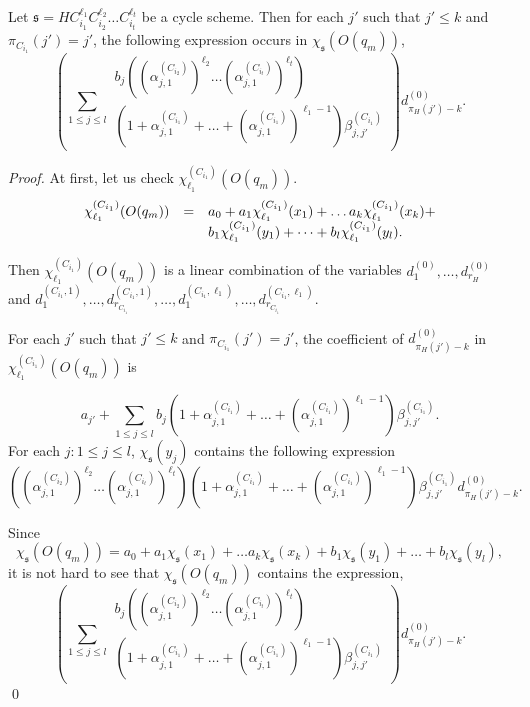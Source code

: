 \documentclass[runningheads,a4paper]{llncs}
\def\schm{{\mathfrak{s} }}
\begin{document}
\begin{proposition}\label{prop-cycle-schm}
Let $\schm=HC_{i_1}^{\ell_1} C_{i_2}^{\ell_2} \dots C_{i_t}^{\ell_t}$ be a cycle scheme. Then for each $j'$ such that $j' \le k$ and $\pi_{C_{i_1}}(j')=j'$, the following expression occurs in $\chi_{\schm}(O(q_m))$,
\[
\left(\sum \limits_{1 \le j \le l} 
\begin{array}{l}
b_j \left((\alpha^{(C_{i_2})}_{j,1})^{\ell_2} \dots (\alpha^{(C_{i_t})}_{j,1})^{\ell_t}\right) \\
\left(1+\alpha^{(C_{i_1})}_{j,1} + \dots + (\alpha^{(C_{i_1})}_{j,1})^{\ell_1-1} \right) \beta^{(C_{i_1})}_{j,j'}
\end{array}
\right) d^{(0)}_{\pi_H(j')-k}. 
\]
\end{proposition}

\begin{proof}
At first,  let us check $\chi^{(C_{i_1})}_{\ell_1}(O(q_m))$.
\[
\begin{array}{l c l}
\chi^{(C_{i_1})}_{\ell_1}(O(q_m)) & = & a_0 + a_1 \chi^{(C_{i_1})}_{\ell_1}(x_1) + \dots a_k \chi^{(C_{i_1})}_{\ell_1}(x_k) + \\
& & b_1 \chi^{(C_{i_1})}_{\ell_1}(y_1) + \dots + b_l \chi^{(C_{i_1})}_{\ell_1}(y_l).
\end{array}
\] 

Then $\chi^{(C_{i_1})}_{\ell_1}(O(q_m))$ is a linear combination of the variables $d^{(0)}_1,\dots, d^{(0)}_{r_H}$ and $d^{(C_{i_1},1)}_1,\dots, d^{(C_{i_1},1)}_{r_{C_{i_1}}}, \dots, d^{(C_{i_1},\ell_1)}_1,\dots, d^{(C_{i_1},\ell_1)}_{r_{C_{i_1}}}$.

For each $j'$ such that $j' \le k$ and $\pi_{C_{i_1}}(j')=j'$, the coefficient of $d^{(0)}_{\pi_H(j')-k}$ in $\chi^{(C_{i_1})}_{\ell_1}(O(q_m))$ is 

\[a_{j'} + \sum \limits_{1 \le j \le l} b_j \left(1+\alpha^{(C_{i_1})}_{j,1} + \dots + (\alpha^{(C_{i_1})}_{j,1})^{\ell_1-1} \right) \beta^{(C_{i_1})}_{j,j'}.\]
%
%
For each $j: 1 \le j \le l$, $\chi_{\schm}(y_j)$ contains the following expression 
\[\left((\alpha^{(C_{i_2})}_{j,1})^{\ell_2} \dots (\alpha^{(C_{i_t})}_{j,1})^{\ell_t}\right)\left(1+\alpha^{(C_{i_1})}_{j,1} + \dots + (\alpha^{(C_{i_1})}_{j,1})^{\ell_1-1} \right) \beta^{(C_{i_1})}_{j,j'} d^{(0)}_{\pi_H(j')-k}.\]

Since 
\[
\chi_{\schm}(O(q_m)) = a_0 + a_1 \chi_{\schm}(x_1) + \dots a_k \chi_{\schm}(x_k) + b_1 \chi_{\schm}(y_1) + \dots + b_l \chi_{\schm}(y_l),
\] 
it is not hard to see that $\chi_\schm(O(q_m))$ contains the expression,
\[
\left(\sum \limits_{1 \le j \le l} 
\begin{array}{l}
b_j \left((\alpha^{(C_{i_2})}_{j,1})^{\ell_2} \dots (\alpha^{(C_{i_t})}_{j,1})^{\ell_t}\right) \\
\left(1+\alpha^{(C_{i_1})}_{j,1} + \dots + (\alpha^{(C_{i_1})}_{j,1})^{\ell_1-1} \right) \beta^{(C_{i_1})}_{j,j'}
\end{array}
\right) d^{(0)}_{\pi_H(j')-k}. 
\]
\qed
\end{proof}
\end{document}
